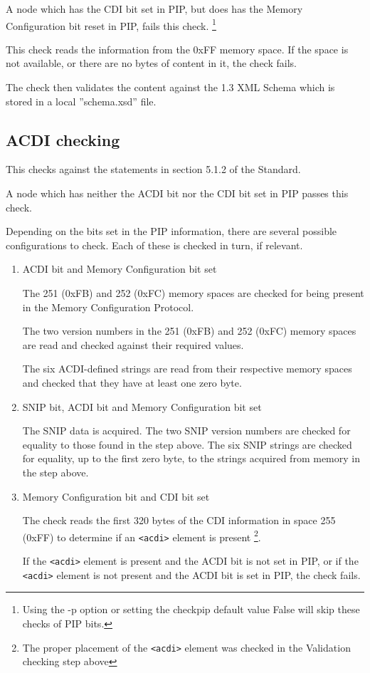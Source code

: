 \documentclass[11pt]{article}
\newcommand*{\xml}[1]{\texttt{<#1>}}
\begin{document}
A node which has the CDI bit set in PIP, but does
has the Memory Configuration bit reset in PIP, fails this check.
\footnote{Using the -p option or setting the checkpip default value False will 
skip these checks of PIP bits.}

This check reads the information from the 0xFF memory space.
If the space is not available, or there are no bytes of content in it, the check fails.
 
The check then validates the content against the 1.3 XML Schema
which is stored in a local ”schema.xsd” file.

\subsection{ACDI checking}

This checks against the statements in section 5.1.2 of the Standard.

A node which has neither the ACDI bit nor the CDI bit set in PIP passes this check.

Depending on the bits set in the PIP information, there are several 
possible configurations to check. Each of these is checked in turn, if relevant.

\begin{enumerate}
\item ACDI bit and Memory Configuration bit set

The 251 (0xFB) and 252 (0xFC) memory spaces are checked for
being present in the Memory Configuration Protocol.

The two version numbers in the 251 (0xFB) and 252 (0xFC) memory spaces
are read and checked against their required values.

The six ACDI-defined strings are read from their respective memory spaces
and checked that they have at least one zero byte.

\item SNIP bit, ACDI bit and Memory Configuration bit set

The SNIP data is acquired. The two SNIP version numbers are checked for equality 
to those found in the step above.  
The six SNIP strings are checked for equality, up to the first zero byte, to the
strings acquired from memory in the step above.

\item Memory Configuration bit and CDI bit set

The check reads the first 320 bytes of the CDI information in space 255 (0xFF) to 
determine if an \xml{acdi} element is present
\footnote{The proper placement of the \xml{acdi} element was checked in the Validation 
checking step above}.  

If the \xml{acdi} element is present and the ACDI bit is not set in PIP, or
if the \xml{acdi} element is not present and the ACDI bit is set in PIP,
the check fails.

\end{enumerate}
\end{document}
